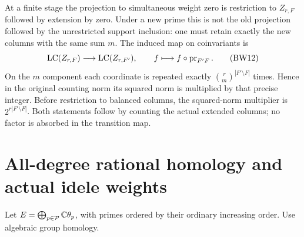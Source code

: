 At a finite stage the projection to simultaneous weight zero is
restriction to $Z_{r,F}$ followed by extension by zero. Under a
new prime this is not the old projection followed by the unrestricted
support inclusion: one must retain exactly the new columns with the
same sum $m$. The induced map on coinvariants is
\[
 \operatorname{LC}(Z_{r,F})\longrightarrow\operatorname{LC}(Z_{r,F'}),\qquad
 f\longmapsto f\circ\operatorname{pr}_{F'F}.
 \tag{BW12}
\]
On the $m$ component each coordinate is repeated exactly
$\binom rm^{|F'\setminus F|}$ times. Hence in the original counting
norm its squared norm is multiplied by that precise integer.
Before restriction to balanced columns, the squared-norm multiplier
is $2^{r|F'\setminus F|}$. Both statements follow by counting the
actual extended columns; no factor is absorbed in the transition map.

\section{All-degree rational homology and actual idele weights}
Let $E=\bigoplus_{p\in\mathcal P}\mathbb C\theta_p$, with primes ordered
by their ordinary increasing order. Use algebraic group homology.

